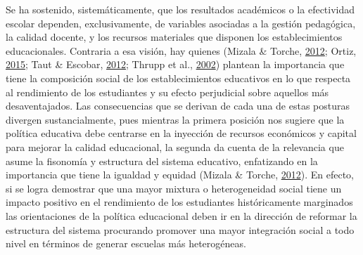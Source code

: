 \documentclass[
]{article}
\begin{document}
Se ha sostenido, sistemáticamente, que los resultados académicos o la
efectividad escolar dependen, exclusivamente, de variables asociadas a
la gestión pedagógica, la calidad docente, y los recursos materiales que
disponen los establecimientos educacionales. Contraria a esa visión, hay
quienes (Mizala \& Torche,
\protect\hyperlink{ref-mizala_bringing_2012}{2012}; Ortiz,
\protect\hyperlink{ref-ortiz_escuelas_2015}{2015}; Taut \& Escobar,
\protect\hyperlink{ref-taut_efecto_2012}{2012}; Thrupp et al.,
\protect\hyperlink{ref-thrupp_school_2002b}{2002}) plantean la
importancia que tiene la composición social de los establecimientos
educativos en lo que respecta al rendimiento de los estudiantes y su
efecto perjudicial sobre aquellos más desaventajados. Las consecuencias
que se derivan de cada una de estas posturas divergen sustancialmente,
pues mientras la primera posición nos sugiere que la política educativa
debe centrarse en la inyección de recursos económicos y capital para
mejorar la calidad educacional, la segunda da cuenta de la relevancia
que asume la fisonomía y estructura del sistema educativo, enfatizando
en la importancia que tiene la igualdad y equidad (Mizala \& Torche,
\protect\hyperlink{ref-mizala_bringing_2012}{2012}). En efecto, si se
logra demostrar que una mayor mixtura o heterogeneidad social tiene un
impacto positivo en el rendimiento de los estudiantes históricamente
marginados las orientaciones de la política educacional deben ir en la
dirección de reformar la estructura del sistema procurando promover una
mayor integración social a todo nivel en términos de generar escuelas
más heterogéneas.
\end{document}
